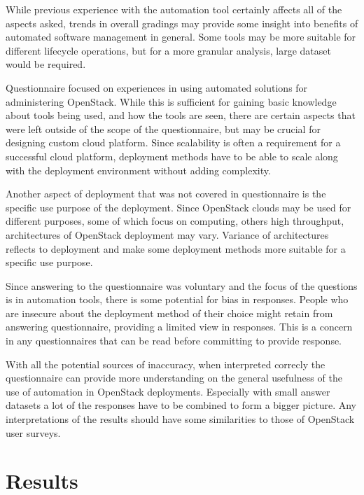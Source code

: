 While previous experience with the automation tool certainly affects all of the
aspects asked, trends in overall gradings may provide some insight into
benefits of automated software management in general. Some tools may be more
suitable for different lifecycle operations, but for a more granular analysis,
large dataset would be required.

Questionnaire focused on experiences in using automated solutions for
administering OpenStack. While this is sufficient for gaining basic knowledge
about tools being used, and how the tools are seen, there are certain aspects
that were left outside of the scope of the questionnaire, but may be crucial
for designing custom cloud platform. Since scalability is often a requirement
for a successful cloud platform, deployment methods have to be able to scale
along with the deployment environment without adding complexity.

Another aspect of deployment that was not covered in questionnaire is the
specific use purpose of the deployment. Since OpenStack clouds may be used for
different purposes, some of which focus on computing, others high throughput,
architectures of OpenStack deployment may vary. Variance of architectures
reflects to deployment and make some deployment methods more suitable for a
specific use purpose.

Since answering to the questionnaire was voluntary and the focus of the
questions is in automation tools, there is some potential for bias in
responses. People who are insecure about the deployment method of their choice
might retain from answering questionnaire, providing a limited view in
responses. This is a concern in any questionnaires that can be read before
committing to provide response.

With all the potential sources of inaccuracy, when interpreted correcly the
questionnaire can provide more understanding on the general usefulness of the
use of automation in OpenStack deployments. Especially with small answer
datasets a lot of the responses have to be combined to form a bigger picture.
Any interpretations of the results should have some similarities to those of
OpenStack user surveys.

\section{Results}

